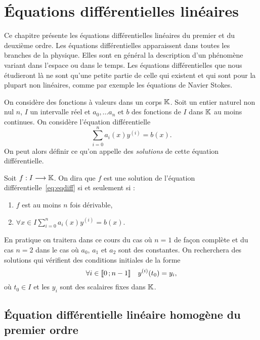 \chapter{Équations différentielles linéaires}
\label{chap:equadiff}
\minitoc
\minilof
\minilot

Ce chapitre présente les équations différentielles linéaires du premier et du deuxième ordre. Les équations différentielles apparaissent dans toutes les branches de la physique. Elles sont en général la description d'un phénomène variant dans l'espace ou dans le temps. Les équations différentielles que nous étudieront là ne sont qu'une petite partie de celle qui existent et qui sont pour la plupart non linéaires, comme par exemple les équations de Navier Stokes.

On considère des fonctions à valeurs dans un corps \(\mathbb{K}\). Soit un entier naturel non nul \(n\), \(I\) un intervalle réel et \(a_0, \ldots a_n\) et \(b\) des fonctions de \(I\) dans \(\mathbb{K}\) au moins continues. On considère l'équation différentielle
\begin{equation}
\sum_{i=0}^n a_i(x) y^{(i)} = b(x) \label{eq:eqdiff}.
\end{equation}
On peut alors définir ce qu'on appelle des \emph{solutions} de cette équation différentielle.
\begin{defdef}
Soit \(f : I \longrightarrow \mathbb{K}\). On dira que \(f\) est une solution de l'équation différentielle~\eqref{eq:eqdiff} si et seulement si :
\begin{enumerate}
\item \(f\) est au moins \(n\) fois dérivable,
\item \(\forall x \in I \sum_{i=0}^n a_i(x) y^{(i)} = b(x)\).
\end{enumerate}
\end{defdef}
En pratique on traitera dans ce cours du cas où \(n=1\) de façon complète et du cas \(n=2\) dans le cas où \(a_0\), \(a_1\) et \(a_2\) sont des constantes. On recherchera des solutions qui vérifient des conditions initiales de la forme 
\begin{equation}
 \forall i \in \mathopen{\llbracket}0\mathclose{}\mathpunct{};n-1\mathclose{\rrbracket} \quad y^{(i)}(t_0)=y_i,
\end{equation}
où \(t_0 \in I\)  et les \(y_i\) sont des scalaires fixes dans \(\mathbb{K}\).
\section{Équation différentielle linéaire homogène du premier ordre}
\label{sec:equadifflinhomog1}
